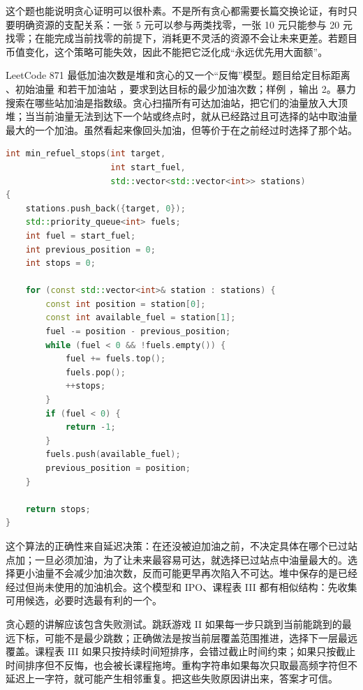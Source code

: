这个题也能说明贪心证明可以很朴素。不是所有贪心都需要长篇交换论证，有时只要明确资源的支配关系：一张 5 元可以参与两类找零，一张 10 元只能参与 20 元找零；在能完成当前找零的前提下，消耗更不灵活的资源不会让未来更差。若题目币值变化，这个策略可能失效，因此不能把它泛化成“永远优先用大面额”。

LeetCode 871 最低加油次数是堆和贪心的又一个“反悔”模型。题目给定目标距离 、初始油量  和若干加油站 ，要求到达目标的最少加油次数；样例 ，输出 2。暴力搜索在哪些站加油是指数级。贪心扫描所有可达加油站，把它们的油量放入大顶堆；当当前油量无法到达下一个站或终点时，就从已经路过且可选择的站中取油量最大的一个加油。虽然看起来像回头加油，但等价于在之前经过时选择了那个站。

\begin{lstlisting}[language=C++,caption={LeetCode 871 最小加油次数：不可达时从已过站点中选最大油量}]
int min_refuel_stops(int target,
                     int start_fuel,
                     std::vector<std::vector<int>> stations)
{
    stations.push_back({target, 0});
    std::priority_queue<int> fuels;
    int fuel = start_fuel;
    int previous_position = 0;
    int stops = 0;

    for (const std::vector<int>& station : stations) {
        const int position = station[0];
        const int available_fuel = station[1];
        fuel -= position - previous_position;
        while (fuel < 0 && !fuels.empty()) {
            fuel += fuels.top();
            fuels.pop();
            ++stops;
        }
        if (fuel < 0) {
            return -1;
        }
        fuels.push(available_fuel);
        previous_position = position;
    }

    return stops;
}
\end{lstlisting}

这个算法的正确性来自延迟决策：在还没被迫加油之前，不决定具体在哪个已过站点加；一旦必须加油，为了让未来最容易可达，就选择已过站点中油量最大的。选择更小油量不会减少加油次数，反而可能更早再次陷入不可达。堆中保存的是已经经过但尚未使用的加油机会。这个模型和 IPO、课程表 III 都有相似结构：先收集可用候选，必要时选最有利的一个。

贪心题的讲解应该包含失败测试。跳跃游戏 II 如果每一步只跳到当前能跳到的最远下标，可能不是最少跳数；正确做法是按当前层覆盖范围推进，选择下一层最远覆盖。课程表 III 如果只按持续时间短排序，会错过截止时间约束；如果只按截止时间排序但不反悔，也会被长课程拖垮。重构字符串如果每次只取最高频字符但不延迟上一字符，就可能产生相邻重复。把这些失败原因讲出来，答案才可信。

